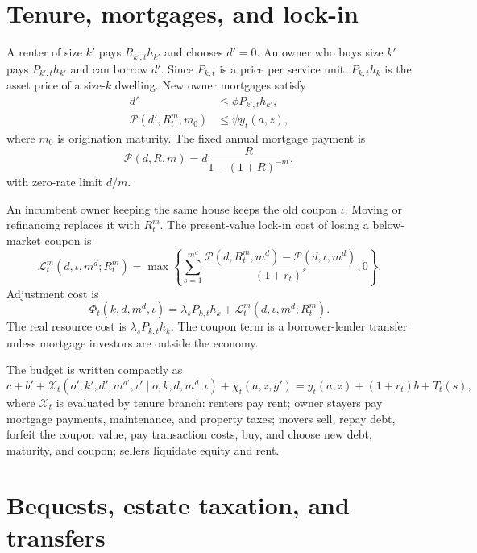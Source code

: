 \documentclass[11pt]{article}
\newcommand{\1}{\mathbf 1}
\begin{document}
\section{Tenure, mortgages, and lock-in}

A renter of size $k'$ pays $R_{k',t}h_{k'}$ and chooses $d'=0$. An owner who buys size $k'$ pays $P_{k',t}h_{k'}$ and can borrow $d'$. Since $P_{k,t}$ is a price per service unit, $P_{k,t}h_k$ is the asset price of a size-$k$ dwelling. New owner mortgages satisfy
\begin{align}
d'&\le \phi P_{k',t}h_{k'},\label{eq:ltv_quant}\\
\mathcal P(d',R_t^m,m_0)&\le \psi y_t(a,z),\label{eq:pti_quant}
\end{align}
where $m_0$ is origination maturity. The fixed annual mortgage payment is
\begin{equation}
\mathcal P(d,R,m)=d\frac{R}{1-(1+R)^{-m}},
\label{eq:mortgage_payment}
\end{equation}
with zero-rate limit $d/m$.

An incumbent owner keeping the same house keeps the old coupon $\iota$. Moving or refinancing replaces it with $R_t^m$. The present-value lock-in cost of losing a below-market coupon is
\begin{equation}
\mathcal L_t^m(d,\iota,m^d;R_t^m)=\max\left\{\sum_{s=1}^{m^d}\frac{\mathcal P(d,R_t^m,m^d)-\mathcal P(d,\iota,m^d)}{(1+r_t)^s},0\right\}.
\label{eq:pv_lockin_quant}
\end{equation}
Adjustment cost is
\begin{equation}
\Phi_t(k,d,m^d,\iota)=\lambda_s P_{k,t}h_k+\mathcal L_t^m(d,\iota,m^d;R_t^m).
\label{eq:adjustment_quant}
\end{equation}
The real resource cost is $\lambda_sP_{k,t}h_k$. The coupon term is a borrower-lender transfer unless mortgage investors are outside the economy.

The budget is written compactly as
\begin{equation}
c+b'+\mathcal X_t(o',k',d',m^{d\prime},\iota'\mid o,k,d,m^d,\iota)+\chi_t(a,z,g')=y_t(a,z)+(1+r_t)b+T_t(s),
\label{eq:budget_quant}
\end{equation}
where $\mathcal X_t$ is evaluated by tenure branch: renters pay rent; owner stayers pay mortgage payments, maintenance, and property taxes; movers sell, repay debt, forfeit the coupon value, pay transaction costs, buy, and choose new debt, maturity, and coupon; sellers liquidate equity and rent.

\section{Bequests, estate taxation, and transfers}
\end{document}
